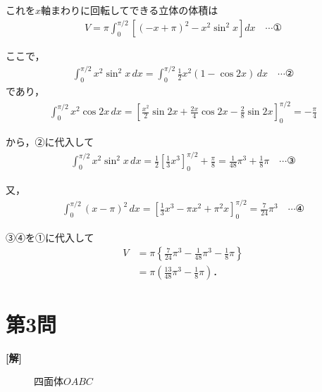 \documentclass[../main.tex]{subfiles}
\begin{document}
これを$x$軸まわりに回転してできる立体の体積は
\begin{align*}
  V=\pi\int_0^{\pi/2}\left[(-x+\pi)^2-x^2\sin^2x\right]dx\quad\cdots①
\end{align*}

ここで，
\begin{align*}
  \int_0^{\pi/2}x^2\sin^2x\,dx=\int_0^{\pi/2}\frac12x^2(1-\cos2x)\,dx\quad\cdots②
\end{align*}
であり，
\begin{align*}
  \int_0^{\pi/2}x^2\cos2x\,dx=\left[\frac{x^2}2\sin2x+\frac{2x}4\cos2x-\frac28\sin2x\right]_0^{\pi/2}=-\frac\pi4
\end{align*}

から，②に代入して
\begin{align*}
  \int_0^{\pi/2}x^2\sin^2x\,dx=\frac12\left[\frac13x^3\right]_0^{\pi/2}+\frac\pi8=\frac1{48}\pi^3+\frac18\pi\quad\cdots③
\end{align*}

又，
\begin{align*}
  \int_0^{\pi/2}(x-\pi)^2\,dx=\left[\frac13x^3-\pi x^2+\pi^2x\right]_0^{\pi/2}=\frac7{24}\pi^3\quad\cdots④
\end{align*}

③④を①に代入して
\begin{align*}
  V&=\pi\left\{\frac7{24}\pi^3-\frac1{48}\pi^3-\frac18\pi\right\}\\
  &=\pi\left(\frac{13}{48}\pi^3-\frac18\pi\right)．
\end{align*}

\newpage

\section*{第3問}

{\bf [解]}

\begin{figure}[htb]
  \centering
  \caption{四面体$OABC$}
\end{figure}
\end{document}
